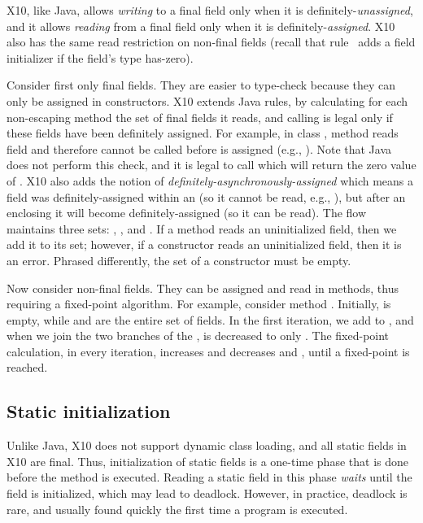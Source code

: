X10, like Java, allows \emph{writing} to a final field only when it is definitely-\emph{unassigned},
    and it allows \emph{reading} from a final field only when it is definitely-\emph{assigned}.
X10 also has the same read restriction on non-final fields
    (recall that rule~ adds a field initializer if the field's type has-zero).


Consider first only final fields.
    They are easier to type-check because they can only be assigned in constructors.
X10 extends Java rules,
    by calculating for each non-escaping method  the set of final fields it reads,
    and calling  is legal only if these fields have been definitely assigned.
For example, in class , method  reads field 
    and therefore cannot be called before  is assigned (e.g., ).
Note that Java does not perform this check, and it is legal to call 
    which will return the zero value of .
X10 also adds the notion of \emph{definitely-asynchronously-assigned}
    which means a field was definitely-assigned within an 
    (so it cannot be read, e.g., ),
    but after an enclosing  it will become definitely-assigned
    (so it can be read).
The flow maintains three sets:
    , , and .
If a method reads an uninitialized field, then we add it to its  set;
    however, if a constructor reads an uninitialized field, then it is an error.
Phrased differently, the  set of a constructor must be empty.

Now consider non-final fields.
    They can be assigned and read in methods,
        thus requiring a fixed-point algorithm.
For example, consider method .
Initially,  is empty,
    while  and  are the entire set of fields.
In the first iteration, we add  to ,
    and when we join the two branches of the ,
     is decreased to only .
The fixed-point calculation, in every iteration, increases 
    and decreases  and ,
    until a fixed-point is reached.


\subsection{Static initialization}
Unlike Java, X10 does not support dynamic class loading,
    and all static fields in X10 are final.
Thus, initialization of static fields is a one-time phase %
    that is done before the  method is executed.
Reading a static field in this phase \emph{waits} until the field is initialized,
    which may lead to deadlock.
However, in practice, deadlock is rare,
    and usually found quickly the first time a program is executed.\

